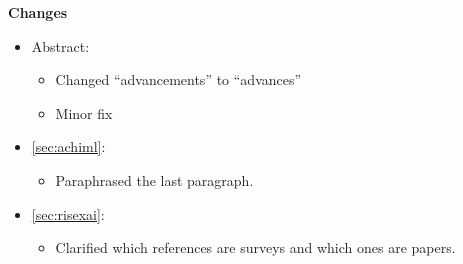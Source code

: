 \color{blue}
\textbf{Changes}

\begin{itemize}
	\item Abstract:
		\begin{itemize}
			\item Changed ``advancements'' to ``advances''
			\item Minor fix
		\end{itemize}
	\item \autoref{sec:achiml}:
		\begin{itemize}
			\item Paraphrased the last paragraph.
		\end{itemize}
	\item \autoref{sec:risexai}:
		\begin{itemize}
			\item Clarified which references are surveys and which ones are papers.
		\end{itemize}

\end{itemize}
\color{black}
